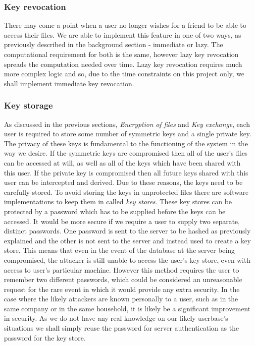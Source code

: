 \documentclass[12pt, titlepage]{article}
\begin{document}
\subsubsection{Key revocation}
There may come a point when a user no longer wishes for a friend to be able to access their files. We are able to implement this feature in one of two ways, as previously described in the background section - immediate or lazy. The computational requirement for both is the same, however lazy key revocation spreads the computation needed over time. Lazy key revocation requires much more complex logic and so, due to the time constraints on this project only, we shall implement immediate key revocation. 

\subsubsection{Key storage}
As discussed in the previous sections, \textit{Encryption of files} and \textit{Key exchange}, each user is required to store some number of symmetric keys and a single private key. The privacy of these keys is fundamental to the functioning of the system in the way we desire. If the symmetric keys are compromised then all of the user's files can be accessed at will, as well as all of the keys which have been shared with this user. If the private key is compromised then all future keys shared with this user can be intercepted and derived. Due to these reasons, the keys need to be carefully stored. To avoid storing the keys in unprotected files there are software implementations to keep them in called \textit{key stores}. These key stores can be protected by a password which has to be supplied before the keys can be accessed. It would be more secure if we require a user to supply two separate, distinct passwords. One password is sent to the server to be hashed as previously explained and the other is not sent to the server and instead used to create a key store. This means that even in the event of the database at the server being compromised, the attacker is still unable to access the user's key store, even with access to user's particular machine. However this method requires the user to remember two different passwords, which could be considered an unreasonable request for the rare event in which it would provide any extra security. In the case where the likely attackers are known personally to a user, such as in the same company or in the same household, it is likely be a significant improvement in security. As we do not have any real knowledge on our likely userbase's situations we shall simply reuse the password for server authentication as the password for the key store.
\end{document}
